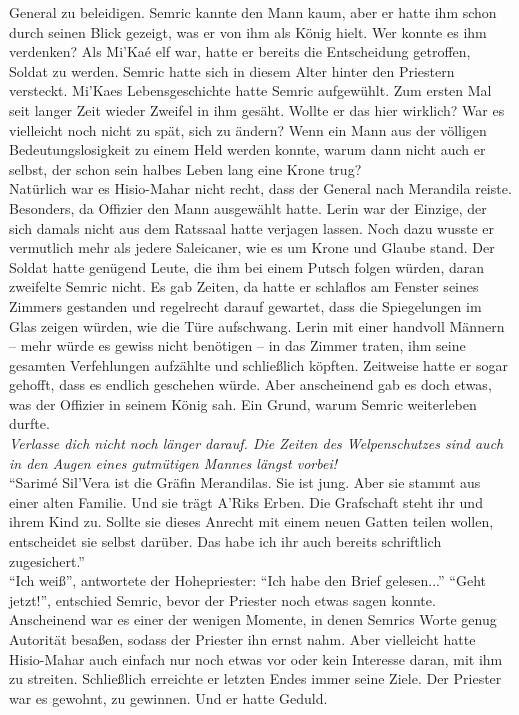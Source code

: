 General zu beleidigen. Semric kannte den Mann kaum, aber er hatte ihm schon durch seinen Blick 
gezeigt, was er von ihm als König hielt. Wer konnte es ihm verdenken? Als Mi'Kaé elf war, hatte er 
bereits die Entscheidung getroffen, Soldat zu werden. Semric hatte sich in diesem Alter hinter den 
Priestern versteckt. Mi'Kaes Lebensgeschichte hatte Semric aufgewühlt. Zum ersten Mal seit langer 
Zeit wieder Zweifel in ihm gesäht. Wollte er das hier wirklich? War es vielleicht noch nicht zu 
spät, sich zu ändern? Wenn ein Mann aus der völligen Bedeutungslosigkeit zu einem Held werden 
konnte, warum dann nicht auch er selbst, der schon sein halbes Leben lang eine Krone trug?\\
Natürlich war es Hisio-Mahar nicht recht, dass der General nach Merandila reiste. Besonders, da 
Offizier den Mann ausgewählt hatte. Lerin war der Einzige, der sich damals nicht aus dem Ratssaal 
hatte verjagen lassen. Noch dazu wusste er vermutlich mehr als jedere Saleicaner, wie es um 
Krone und Glaube stand. Der Soldat hatte genügend Leute, die ihm bei einem Putsch folgen würden, 
daran zweifelte Semric nicht. Es gab Zeiten, da hatte er schlaflos am Fenster seines Zimmers 
gestanden und regelrecht darauf gewartet, dass die Spiegelungen im Glas zeigen würden, wie die Türe 
aufschwang. Lerin mit einer handvoll Männern – mehr würde es gewiss nicht benötigen – in das Zimmer 
traten, ihm seine gesamten Verfehlungen aufzählte und schließlich köpften. Zeitweise hatte er sogar 
gehofft, dass es endlich geschehen würde. Aber anscheinend gab es doch etwas, was der Offizier in 
seinem König sah. Ein Grund, warum Semric weiterleben durfte.\\
\textit{Verlasse dich nicht noch länger darauf. Die Zeiten des Welpenschutzes sind auch in den 
Augen eines gutmütigen Mannes längst vorbei!}\\
``Sarimé Sil'Vera ist die Gräfin Merandilas. Sie ist jung. Aber sie stammt aus einer alten Familie. 
Und sie trägt A'Riks Erben. Die Grafschaft steht ihr und ihrem Kind zu. Sollte sie dieses Anrecht 
mit einem neuen Gatten teilen wollen, entscheidet sie selbst darüber. Das habe ich ihr auch bereits 
schriftlich zugesichert.''\\
``Ich weiß'', antwortete der Hohepriester: ``Ich habe den Brief gelesen...''
``Geht jetzt!'', entschied Semric, bevor der Priester noch etwas sagen konnte. \\
Anscheinend war es einer der wenigen Momente, in denen Semrics Worte genug Autorität besaßen, 
sodass der Priester ihn ernst nahm. Aber vielleicht hatte Hisio-Mahar auch einfach nur noch etwas 
vor oder kein Interesse daran, mit ihm zu streiten. Schließlich erreichte er letzten Endes 
immer seine Ziele. Der Priester war es gewohnt, zu gewinnen. Und er hatte Geduld. \\



